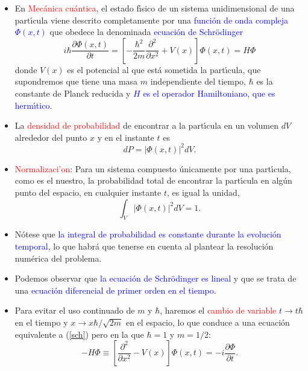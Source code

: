 \documentclass[12pt,spanish]{iopart}
\def\az{\textcolor{blue}}
\def\ro{\textcolor{red}}
\begin{document}
\begin{itemize}

\item En \ro{Mec\'anica cu\'antica}, el estado f\'{\i}sico de un sistema unidimensional de una part\'{\i}cula viene
descrito completamente por una \az{funci\'on de onda compleja $\Phi(x,t)$} que obedece la denominada \az{ecuaci\'on 
de Schr\"odinger}
%
\begin{equation}
\label{sch}
i\hbar \frac{\partial \Phi(x,t)}{\partial t} =
\left[ -\frac{\hbar^2}{2m}  \frac{\partial^2}{\partial x^2} + V(x) \right] \Phi(x,t)= H\Phi
\end{equation}
%
donde $V(x)$ es el potencial al que est\'a sometida la part\'{\i}cula, 
que supondremos que tiene una masa $m$ independiente del tiempo, $\hbar$  es la constante
de Planck reducida y \az{$H$ es el operador Hamiltoniano, que es herm\'{\i}tico}.

\item La \ro{densidad de probabilidad} de encontrar a la part\'{\i}cula en un volumen $dV$ alrededor del 
punto $x$ y en el instante $t$ es 
%
\begin{equation}
dP=|\Phi(x,t)|^2 dV.
\end{equation}
%

\item \ro{Normalizaci'on}: Para un sistema compuesto \'unicamente por una part\'{\i}cula, como es el nuestro, la
probabilidad total de encontrar la part\'{\i}cula en alg\'un punto del espacio,
en cualquier instante $t$, es igual la unidad,
%
\begin{equation}
\label{3}
\int_V |\Phi(x,t)|^2 dV=1.
\end{equation}
%

\item N\'otese que \az{la integral de probabilidad es constante durante la evoluci\'on
temporal}, lo que habr\'a que tenerse en cuenta al plantear la resoluci\'on
num\'erica del problema.

\item Podemos observar que \az{la ecuaci\'on de Schr\"odinger es lineal} y
que se trata de una \az{ecuaci\'on diferencial de primer orden en el tiempo}.

\item Para evitar el uso continuado de $m$ y $\hbar$, haremos el \ro{cambio de variable} $t\rightarrow t\hbar$
en el tiempo  y $x\rightarrow x \hbar/\sqrt{2m}$ en 
el espacio, lo que conduce a una ecuaci{\'o}n equivalente a (\ref{sch}) pero en la que $\hbar=1$ y
$m=1/2$:
%
\begin{equation}
\label{7}
-H\Phi\equiv \left[ \frac{\partial^2}{\partial x^2}- V(x) \right]\Phi(x,t) =
-i\frac{\partial \Phi}{\partial t}.
\end{equation}


\end{itemize}
\end{document}
